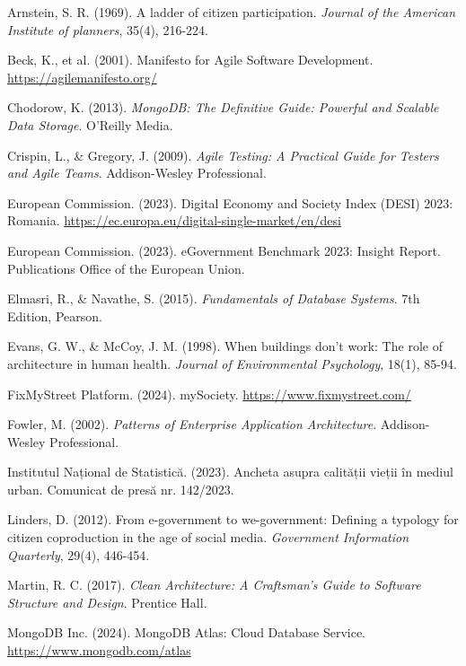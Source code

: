 \documentclass[12pt,a4paper]{report}
\begin{document}
\begin{thebibliography}{99}

Arnstein, S. R. (1969). A ladder of citizen participation. \textit{Journal of the American Institute of planners}, 35(4), 216-224.

Beck, K., et al. (2001). Manifesto for Agile Software Development. \url{https://agilemanifesto.org/}

Chodorow, K. (2013). \textit{MongoDB: The Definitive Guide: Powerful and Scalable Data Storage}. O'Reilly Media.

Crispin, L., \& Gregory, J. (2009). \textit{Agile Testing: A Practical Guide for Testers and Agile Teams}. Addison-Wesley Professional.

European Commission. (2023). Digital Economy and Society Index (DESI) 2023: Romania. \url{https://ec.europa.eu/digital-single-market/en/desi}

European Commission. (2023). eGovernment Benchmark 2023: Insight Report. Publications Office of the European Union.

Elmasri, R., \& Navathe, S. (2015). \textit{Fundamentals of Database Systems}. 7th Edition, Pearson.

Evans, G. W., \& McCoy, J. M. (1998). When buildings don't work: The role of architecture in human health. \textit{Journal of Environmental Psychology}, 18(1), 85-94.

FixMyStreet Platform. (2024). mySociety. \url{https://www.fixmystreet.com/}

Fowler, M. (2002). \textit{Patterns of Enterprise Application Architecture}. Addison-Wesley Professional.

Institutul Național de Statistică. (2023). Ancheta asupra calității vieții în mediul urban. Comunicat de presă nr. 142/2023.

Linders, D. (2012). From e-government to we-government: Defining a typology for citizen coproduction in the age of social media. \textit{Government Information Quarterly}, 29(4), 446-454.

Martin, R. C. (2017). \textit{Clean Architecture: A Craftsman's Guide to Software Structure and Design}. Prentice Hall.

MongoDB Inc. (2024). MongoDB Atlas: Cloud Database Service. \url{https://www.mongodb.com/atlas}


\end{thebibliography}
\end{document}
